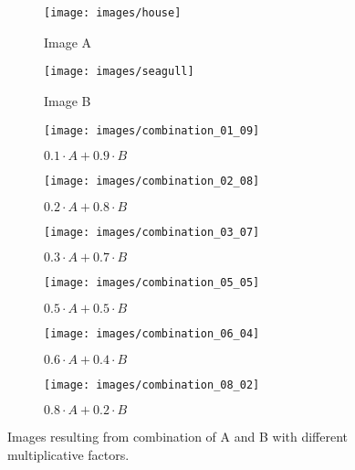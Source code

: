 \documentclass[journal]{IEEEtran}
\begin{document}
\begin{figure}[!]
	\centering
	\begin{subfigure}{0.2\textwidth}
		\centering
		\texttt{[image: images/house]} 
		\caption{Image A}
		\label{fig:merge:original_a}
	\end{subfigure}
	\centering
	\begin{subfigure}{0.2\textwidth}
		\centering
		\texttt{[image: images/seagull]}
		\caption{Image B}
		\label{fig:merge:original_b}
	\end{subfigure}
	
	\centering
	\begin{subfigure}{0.14\textwidth}
		\centering
		\texttt{[image: images/combination\_01\_09]} 
		\caption{$0.1\cdot A+0.9\cdot B$}
		\label{fig:merge:combination_01_09}
	\end{subfigure}
	\centering
	\begin{subfigure}{0.14\textwidth}
		\centering
		\texttt{[image: images/combination\_02\_08]} 
		\caption{$0.2\cdot A+0.8\cdot B$}
		\label{fig:merge:combination_02_08}
	\end{subfigure}
	\centering
	\begin{subfigure}{0.14\textwidth}
		\centering
		\texttt{[image: images/combination\_03\_07]}
		\caption{$0.3\cdot A+0.7\cdot B$}
		\label{fig:merge:combination_03_07}
	\end{subfigure}
	\centering
	\begin{subfigure}{0.14\textwidth}
		\centering
		\texttt{[image: images/combination\_05\_05]} 
		\caption{$0.5\cdot A+0.5\cdot B$}
		\label{fig:merge:combination_05_05}
	\end{subfigure}
	\centering
	\begin{subfigure}{0.14\textwidth}
		\centering
		\texttt{[image: images/combination\_06\_04]}
		\caption{$0.6\cdot A+0.4\cdot B$}
		\label{fig:merge:combination_06_04}
	\end{subfigure}
	\centering
	\begin{subfigure}{0.14\textwidth}
		\centering
		\texttt{[image: images/combination\_08\_02]}
		\caption{$0.8\cdot A+0.2\cdot B$}
		\label{fig:merge:combination_08_02}
	\end{subfigure}
	
	\caption{Images resulting from combination of A and B with different multiplicative factors.}
	\label{fig:combination:results}
	
\end{figure}
\end{document}
